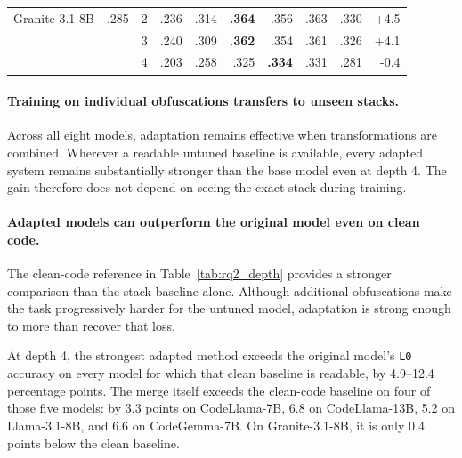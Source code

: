 \begin{table}[!t]
\begin{tabular}{@{}lrrrrrrrrr@{}}
\addlinespace[2pt]

Granite-3.1-8B
& .285
& 2
& .236
& \textcolor{green!55!black}{.314}
& \textbf{\textcolor{green!55!black}{.364}}
& \textcolor{green!55!black}{.356}
& \textcolor{green!55!black}{.363}
& \textcolor{green!55!black}{.330}
& \textcolor{green!55!black}{+4.5} \\
&
& 3
& .240
& \textcolor{green!55!black}{.309}
& \textbf{\textcolor{green!55!black}{.362}}
& \textcolor{green!55!black}{.354}
& \textcolor{green!55!black}{.361}
& \textcolor{green!55!black}{.326}
& \textcolor{green!55!black}{+4.1} \\
&
& 4
& .203
& \textcolor{green!55!black}{.258}
& \textcolor{green!55!black}{.325}
& \textbf{\textcolor{green!55!black}{.334}}
& \textcolor{green!55!black}{.331}
& \textcolor{green!55!black}{.281}
& \textcolor{red!70!black}{-0.4} \\

\bottomrule
\end{tabular}
\end{table}

\paragraph{Training on individual obfuscations transfers to unseen stacks.}
Across all eight models, adaptation remains effective when transformations are
combined. Wherever a readable untuned baseline is available, every adapted
system remains substantially stronger than the base model even at depth 4.
The gain therefore does not depend on seeing the exact stack during training.

\paragraph{Adapted models can outperform the original model even on clean code.}
The clean-code reference in Table~\ref{tab:rq2_depth} provides a stronger
comparison than the stack baseline alone. Although additional obfuscations make
the task progressively harder for the untuned model, adaptation is strong
enough to more than recover that loss.

At depth 4, the strongest adapted method exceeds the original model's
\texttt{L0} accuracy on every model for which that clean baseline is readable,
by 4.9--12.4 percentage points. The merge itself exceeds the clean-code
baseline on four of those five models: by 3.3 points on CodeLlama-7B, 6.8 on
CodeLlama-13B, 5.2 on Llama-3.1-8B, and 6.6 on CodeGemma-7B. On
Granite-3.1-8B, it is only 0.4 points below the clean baseline.

